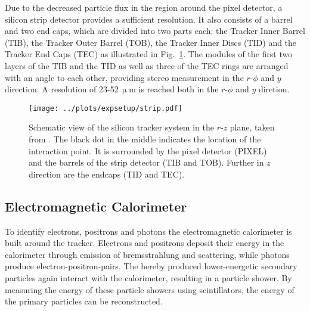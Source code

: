 \noindent Due to the decreased particle flux in the region around the pixel detector, a silicon strip detector provides a sufficient resolution. It also consists of a barrel and two end caps, which are divided into two parts each: the Tracker Inner Barrel (TIB), the Tracker Outer Barrel (TOB), the Tracker Inner Discs (TID) and the Tracker End Caps (TEC) as illustrated in Fig.~\ref{fig:expsetup:strip}. The modules of the first two layers of the TIB and the TID as well as three of the TEC rings are arranged with an angle to each other, providing stereo measurement in the $r$-$\phi$ and $y$ direction. A resolution of 23-52\,$\upmu$m is reached both in the $r$-$\phi$ and $y$ diretion.
\begin{figure}
    \centering
    \texttt{[image: ../plots/expsetup/strip.pdf]}
    \caption[Schematic view of the silicon tracker system]{Schematic view of the silicon tracker system in the $r$-$z$ plane, taken from \cite{strip_fig}. The black dot in the middle indicates the location of the interaction point. It is surrounded by the pixel detector (PIXEL) and the barrels of the strip detector (TIB and TOB). Further in $z$ direction are the endcaps (TID and TEC).}
    \label{fig:expsetup:strip}
\end{figure}

\subsection*{Electromagnetic Calorimeter}
To identify electrons, positrons and photons the electromagnetic calorimeter is built around the tracker. Electrons and positrons deposit their energy in the calorimeter through emission of bremsstrahlung and scattering, while photons produce electron-positron-pairs. The hereby produced lower-energetic secondary particles again interact with the calorimeter, resulting in a particle shower. By measuring the energy of these particle showers using scintillators, the energy of the primary particles can be reconstructed.\\

